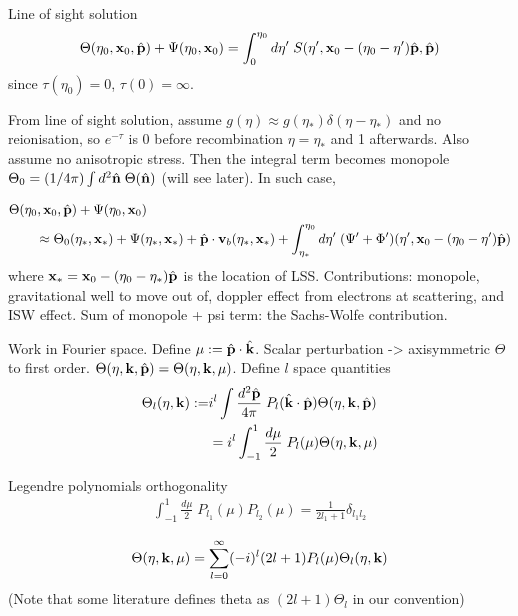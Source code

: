 Line of sight solution
\begin{align}
	\Theta(\eta_0, \mathbf{x}_0, \hat{\mathbf{p}}) + \Psi(\eta_0, \mathbf{x}_0) = \int_0^{\eta_0} d\eta' \; S(\eta', \mathbf{x}_0 - (\eta_0 -\eta') \hat{\mathbf{p}}, \hat{\mathbf{p}})
\end{align}
since $\tau(\eta_0)=0$, $\tau(0) = \infty$.

From line of sight solution, assume $g(\eta)\approx g(\eta_*)\delta(\eta-\eta_*)$ and no reionisation, so $e^{-\tau}$ is 0 before recombination $\eta=\eta_*$ and 1 afterwards. Also assume no anisotropic stress. Then the integral term becomes monopole $\Theta_0 = (1/4\pi)\int d^2\hat{\mathbf{n}} \;\Theta(\hat{\mathbf{n}})$ (will see later). In such case,

\begin{align}
	&\Theta(\eta_0, \mathbf{x}_0, \hat{\mathbf{p}}) + \Psi(\eta_0, \mathbf{x}_0) \nonumber \\
	&\qquad \approx \Theta_0(\eta_*, \mathbf{x}_*) + \Psi(\eta_*, \mathbf{x}_*) + \hat{\mathbf{p}}\cdot \mathbf{v}_b (\eta_*, \mathbf{x}_*) + \int_{\eta_*}^{\eta_0} d\eta' \; (\Psi' + \Phi')(\eta', \mathbf{x}_0-(\eta_0-\eta')\hat{\mathbf{p}}) \label{eqn:line_of_sight_solution_approximated}
\end{align}
where $\mathbf{x}_* = \mathbf{x}_0-(\eta_0-\eta_*)\hat{\mathbf{p}}$ is the location of LSS. Contributions: monopole, gravitational well to move out of, doppler effect from electrons at scattering, and ISW effect. Sum of monopole + psi term: the Sachs-Wolfe contribution.


Work in Fourier space. Define $\mu := \hat{\mathbf{p}}\cdot\hat{\mathbf{k}}$. Scalar perturbation -> axisymmetric $\Theta$ to first order. $\Theta(\eta,\mathbf{k},\hat{\mathbf{p}}) = \Theta(\eta,\mathbf{k},\mu)$. Define $l$ space quantities
\begin{align}
	\Theta_l (\eta,\mathbf{k}) :=& i^l \int \frac{d^2 \hat{\mathbf{p}}}{4\pi} \; P_l (\hat{\mathbf{k}} \cdot \hat{\mathbf{p}}) \Theta(\eta, \mathbf{k}, \hat{\mathbf{p}}) \\
	&= i^l \int^1_{-1} \frac{d\mu}{2} \; P_l (\mu) \Theta(\eta, \mathbf{k}, \mu)
\end{align}

Legendre polynomials orthogonality
\begin{align}
	\int_{-1}^{1} \frac{d\mu}{2} \; P_{l_1}(\mu) P_{l_2}(\mu) = \frac{1}{2l_1 + 1} \delta_{l_1 l_2}
\end{align}

\begin{align}
	\Theta(\eta,\mathbf{k},\mu) = \sum_{l=0}^{\infty} (-i)^l (2l+1) P_l (\mu) \Theta_l (\eta, \mathbf{k})
\end{align}
(Note that some literature defines theta as $(2l+1)\Theta_l$ in our convention)

